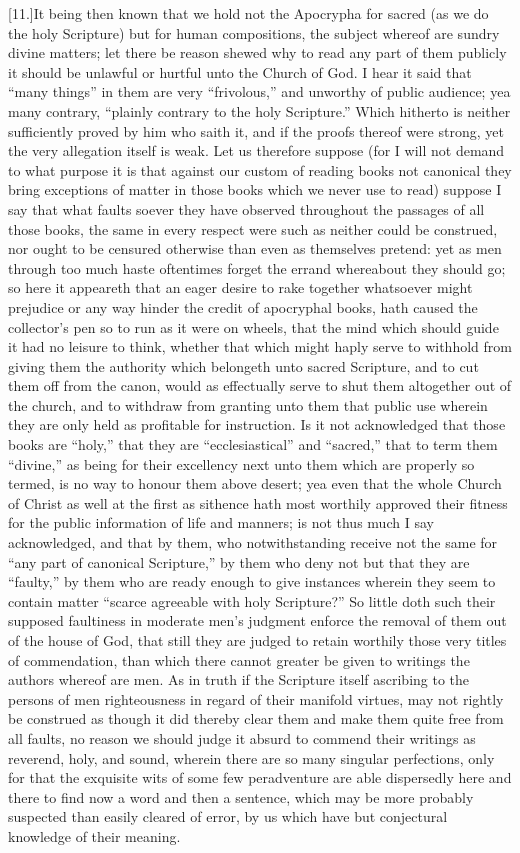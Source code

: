 [11.]It being then known that we hold not the Apocrypha for sacred (as we do the holy Scripture) but for human compositions, the subject whereof are sundry divine matters; let there be reason shewed why to read any part of them publicly it should be unlawful or hurtful unto the Church of God. I  hear it said that “many things” in them are very “frivolous,” and unworthy of public audience; yea many contrary, “plainly contrary to the holy Scripture.” Which hitherto is neither sufficiently proved by him who saith it, and if the proofs thereof were strong, yet the very allegation itself is weak. Let us therefore suppose (for I will not demand to what purpose it is that against our custom of reading books not canonical they bring exceptions of matter in those books which we never use to read) suppose I say that what faults soever they have observed throughout the passages of all those books, the same in every respect were such as neither could be construed, nor ought to be censured otherwise than even as themselves pretend: yet as men through too much haste oftentimes forget the errand whereabout they should go; so here it appeareth that an eager desire to rake together whatsoever might prejudice or any way hinder the credit of apocryphal books, hath caused the collector’s pen so to run as it were on wheels, that the mind which should guide it had no leisure to think, whether that which might haply serve to withhold from giving them the authority which belongeth unto sacred Scripture, and to cut them off from the canon, would as effectually serve to shut them altogether out of the church, and to withdraw from granting unto them that public use wherein they are only held as profitable for instruction. Is it not acknowledged that those  books are “holy,” that they are “ecclesiastical” and “sacred,” that to term them “divine,” as being for their excellency next unto them which are properly so termed, is no way to honour them above desert; yea even that the whole Church of Christ as well at the first as sithence hath most worthily approved their fitness for the public information of life and manners; is not thus much I say acknowledged, and that by them, who notwithstanding receive not the same for “any part of canonical Scripture,” by them who deny not but that they are “faulty,” by them who are ready enough to give instances wherein they seem to contain matter “scarce agreeable with holy Scripture?” So little doth such their supposed faultiness in moderate men’s judgment enforce the removal of them out of the house of God, that still they are judged to retain worthily those very titles of commendation, than which there cannot greater be given to writings the authors whereof are men. As in truth if the Scripture itself ascribing to the persons of men righteousness in regard of their manifold virtues, may not rightly be construed as though it did thereby clear them and make them quite free from all faults, no reason we should judge it absurd to commend their writings as reverend, holy, and sound, wherein there are so many singular perfections, only for that the exquisite wits of some few peradventure are able dispersedly here and there to find now a word and then a sentence, which may be more probably suspected than easily cleared of error, by us which have but conjectural knowledge of their meaning.


